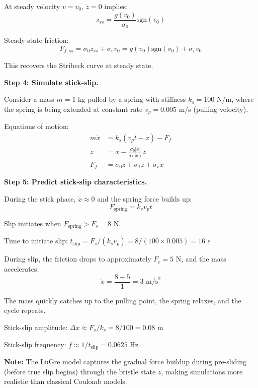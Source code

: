 \begin{example}
At steady velocity $v = v_0$, $\dot{z} = 0$ implies:
\begin{equation}
z_{ss} = \frac{g(v_0)}{\sigma_0}\text{sgn}(v_0)
\end{equation}

Steady-state friction:
\begin{equation}
F_{f,ss} = \sigma_0 z_{ss} + \sigma_v v_0 = g(v_0)\text{sgn}(v_0) + \sigma_v v_0
\end{equation}

This recovers the Stribeck curve at steady state.

\textbf{Step 4: Simulate stick-slip.}

Consider a mass $m = 1$ kg pulled by a spring with stiffness $k_s = 100$ N/m, where the spring is being extended at constant rate $v_p = 0.005$ m/s (pulling velocity).

Equations of motion:
\begin{align}
m\ddot{x} &= k_s(v_p t - x) - F_f \\
\dot{z} &= \dot{x} - \frac{\sigma_0 |\dot{x}|}{g(\dot{x})}z \\
F_f &= \sigma_0 z + \sigma_1 \dot{z} + \sigma_v \dot{x}
\end{align}

\textbf{Step 5: Predict stick-slip characteristics.}

During the stick phase, $\dot{x} \approx 0$ and the spring force builds up:
\begin{equation}
F_{\text{spring}} = k_s v_p t
\end{equation}

Slip initiates when $F_{\text{spring}} > F_s = 8$ N.

Time to initiate slip: $t_{\text{slip}} = F_s/(k_s v_p) = 8/(100 \times 0.005) = 16$ s

During slip, the friction drops to approximately $F_c = 5$ N, and the mass accelerates:
\begin{equation}
\ddot{x} = \frac{8 - 5}{1} = 3 \text{ m/s}^2
\end{equation}

The mass quickly catches up to the pulling point, the spring relaxes, and the cycle repeats.

Stick-slip amplitude: $\Delta x \approx F_s/k_s = 8/100 = 0.08$ m

Stick-slip frequency: $f \approx 1/t_{\text{slip}} = 0.0625$ Hz

\textbf{Note:} The LuGre model captures the gradual force buildup during pre-sliding (before true slip begins) through the bristle state $z$, making simulations more realistic than classical Coulomb models.
\end{example}

